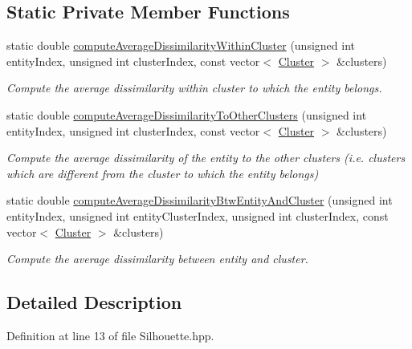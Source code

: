 \subsection*{Static Private Member Functions}
\begin{DoxyCompactItemize}
\item 
static double \hyperlink{classmultiscale_1_1analysis_1_1Silhouette_a9cfc58c766daf74d57c0f109f2e77639}{compute\-Average\-Dissimilarity\-Within\-Cluster} (unsigned int entity\-Index, unsigned int cluster\-Index, const vector$<$ \hyperlink{classmultiscale_1_1analysis_1_1Cluster}{Cluster} $>$ \&clusters)
\begin{DoxyCompactList}\small\item\em Compute the average dissimilarity within cluster to which the entity belongs. \end{DoxyCompactList}\item 
static double \hyperlink{classmultiscale_1_1analysis_1_1Silhouette_a32876a9d476298d1835486a334eee44f}{compute\-Average\-Dissimilarity\-To\-Other\-Clusters} (unsigned int entity\-Index, unsigned int cluster\-Index, const vector$<$ \hyperlink{classmultiscale_1_1analysis_1_1Cluster}{Cluster} $>$ \&clusters)
\begin{DoxyCompactList}\small\item\em Compute the average dissimilarity of the entity to the other clusters (i.\-e. clusters which are different from the cluster to which the entity belongs) \end{DoxyCompactList}\item 
static double \hyperlink{classmultiscale_1_1analysis_1_1Silhouette_aac5c29405d0407da2f21ffac016bfd01}{compute\-Average\-Dissimilarity\-Btw\-Entity\-And\-Cluster} (unsigned int entity\-Index, unsigned int entity\-Cluster\-Index, unsigned int cluster\-Index, const vector$<$ \hyperlink{classmultiscale_1_1analysis_1_1Cluster}{Cluster} $>$ \&clusters)
\begin{DoxyCompactList}\small\item\em Compute the average dissimilarity between entity and cluster. \end{DoxyCompactList}\end{DoxyCompactItemize}


\subsection{Detailed Description}


Definition at line 13 of file Silhouette.\-hpp.



